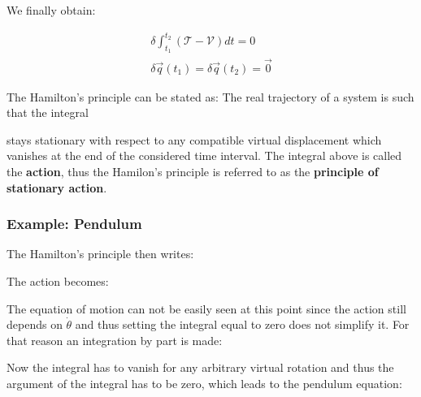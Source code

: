 \documentclass[10pt,a4paper]{scrartcl}
\begin{document}
\begin{multicols*}{2}

We finally obtain:

\begin{align*}
\delta\int_{t_1}^{t_2}\left(\mathcal{T}-\mathcal{V}\right)dt=0\\
\delta\vec{q}(t_1)=\delta\vec{q}(t_2)=\vec{0}
\end{align*}

The Hamilton's principle can be stated as: The real trajectory of a system is such that the integral


stays stationary with respect to any compatible virtual displacement which vanishes at the end of the considered time interval. The integral above is called the \textbf{action}, thus the Hamilon's principle is referred to as the \textbf{principle of stationary action}.

\subsubsection{Example: Pendulum}


The Hamilton's principle then writes:


The action becomes:


The equation of motion can not be easily seen at this point since the action still depends on $\dot{\theta}$ and thus setting the integral equal to zero does not simplify it. For that reason an integration by part is made:


Now the integral has to vanish for any arbitrary virtual rotation and thus the argument of the integral has to be zero, which leads to the pendulum equation:


\end{multicols*}
\end{document}
